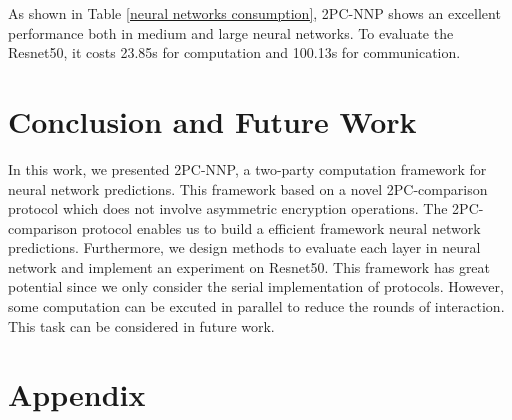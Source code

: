 \documentclass[letterpaper]{article} %
\begin{document}
    \begin{table}[!ht]
    
        \center
        \caption{Experiment III-Neural networks consumption}
        \label{neural networks consumption}
    \end{table}
    
    As shown in Table \ref{neural networks consumption}, 2PC-NNP shows an excellent performance
    both in medium and large neural networks. To evaluate the Resnet50, 
    it costs 23.85s for computation and 100.13s for communication.

    \section{Conclusion and Future Work}
    In this work, we presented 2PC-NNP, a two-party computation framework for neural network predictions.
    This framework based on a novel 2PC-comparison protocol which does not involve asymmetric encryption operations.
    The 2PC-comparison protocol enables us to build a efficient framework neural network predictions.
    Furthermore, we design methods to evaluate each layer in neural network and implement an experiment on Resnet50.
    This framework has great potential since we only consider the serial implementation of protocols.
    However, some computation can be excuted in parallel to reduce the rounds of interaction.
    This task can be considered in future work.



    
    \section{Appendix}
    
\end{document}
